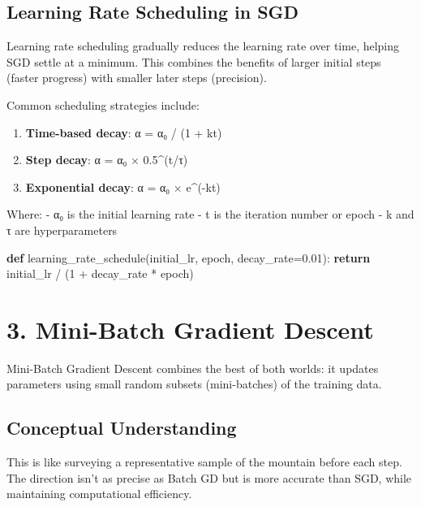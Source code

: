 \documentclass[
  letterpaper,
  DIV=11,
  numbers=noendperiod]{scrreprt}
\newenvironment{Shaded}{\begin{snugshade}}{\end{snugshade}}
\newcommand{\ControlFlowTok}[1]{\textcolor[rgb]{0.00,0.23,0.31}{\textbf{#1}}}
\newcommand{\DecValTok}[1]{\textcolor[rgb]{0.68,0.00,0.00}{#1}}
\newcommand{\FloatTok}[1]{\textcolor[rgb]{0.68,0.00,0.00}{#1}}
\newcommand{\KeywordTok}[1]{\textcolor[rgb]{0.00,0.23,0.31}{\textbf{#1}}}
\newcommand{\NormalTok}[1]{\textcolor[rgb]{0.00,0.23,0.31}{#1}}
\newcommand{\OperatorTok}[1]{\textcolor[rgb]{0.37,0.37,0.37}{#1}}
\providecommand{\tightlist}{%
  \setlength{\itemsep}{0pt}\setlength{\parskip}{0pt}}\usepackage{longtable,booktabs,array}
\begin{document}
\subsection{Learning Rate Scheduling in
SGD}\label{learning-rate-scheduling-in-sgd}

Learning rate scheduling gradually reduces the learning rate over time,
helping SGD settle at a minimum. This combines the benefits of larger
initial steps (faster progress) with smaller later steps (precision).

Common scheduling strategies include:

\begin{enumerate}
\def\labelenumi{\arabic{enumi}.}
\tightlist
\item
  \textbf{Time-based decay}: α = α₀ / (1 + kt)
\item
  \textbf{Step decay}: α = α₀ × 0.5\^{}(t/τ)
\item
  \textbf{Exponential decay}: α = α₀ × e\^{}(-kt)
\end{enumerate}

Where: - α₀ is the initial learning rate - t is the iteration number or
epoch - k and τ are hyperparameters

\begin{Shaded}
\begin{Highlighting}[]
\KeywordTok{def}\NormalTok{ learning\_rate\_schedule(initial\_lr, epoch, decay\_rate}\OperatorTok{=}\FloatTok{0.01}\NormalTok{):}
    \ControlFlowTok{return}\NormalTok{ initial\_lr }\OperatorTok{/}\NormalTok{ (}\DecValTok{1} \OperatorTok{+}\NormalTok{ decay\_rate }\OperatorTok{*}\NormalTok{ epoch)}
\end{Highlighting}
\end{Shaded}

\section{3. Mini-Batch Gradient
Descent}\label{mini-batch-gradient-descent}

Mini-Batch Gradient Descent combines the best of both worlds: it updates
parameters using small random subsets (mini-batches) of the training
data.

\subsection{Conceptual Understanding}\label{conceptual-understanding-3}

This is like surveying a representative sample of the mountain before
each step. The direction isn't as precise as Batch GD but is more
accurate than SGD, while maintaining computational efficiency.
\end{document}
